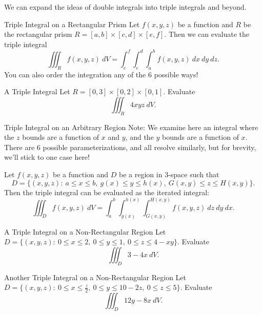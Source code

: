 We can expand the ideas of double integrals into triple integrals and beyond.

\begin{definition}{Triple Integral on a Rectangular Prism}
Let $f(x,y,z)$ be a function and $R$ be the rectangular prism $R=[a,b]\times[c,d]\times[e,f]$. Then we can evaluate the triple integral $$\iiint_R f(x,y,z)\ dV=\int_e^f\int_c^d\int_a^b f(x,y,z) \ dx \ dy \ dz.$$
You can also order the integration any of the 6 possible ways!
\end{definition}

\begin{exercise}{A Triple Integral}
Let $R=[0,3]\times[0,2]\times[0,1]$. Evaluate $$\iiint_R 4xyz \ dV.$$
\end{exercise}

\begin{definition}{Triple Integral on an Arbitrary Region}
Note: We examine here an integral where the $z$ bounds are a function of $x$ and $y$, and the $y$ bounds are a function of $x$. There are 6 possible parameterizations, and all resolve similarly, but for brevity, we'll stick to one case here!

\vspace{1em}

Let $f(x,y,z)$ be a function and $D$ be a region in $3$-space such that $$D=\big\{(x,y,z): \ a\leq x\leq b,\ g(x)\leq y\leq h(x),\ G(x,y)\leq z\leq H(x,y)  \big\}.$$ Then the triple integral can be evaluated as the iterated integral: $$\iiint_D f(x,y,z)\ dV=\int_a^b\int_{g(x)}^{h(x)}\int_{G(x,y)}^{H(x,y)}f(x,y,z)\ dz \ dy \ dx. $$
\end{definition}

\begin{pexercise}{A Triple Integral on a Non-Rectangular Region}%
Let $D=\{(x,y,z):\ 0\leq x\leq 2,\ 0\leq y \leq 1,\ 0\leq z\leq 4-xy \}$. Evaluate $$\iiint_D 3-4x\ dV.$$
\end{pexercise}

\begin{pexercise}{Another Triple Integral on a Non-Rectangular Region}%
Let $D=\{(x,y,z):\ 0\leq x\leq \frac{z}{2},\ 0\leq y\leq 10-2z,\ 0\leq z\leq 5 \}$. Evaluate $$\iiint_D 12y-8x\ dV. $$
\end{pexercise}